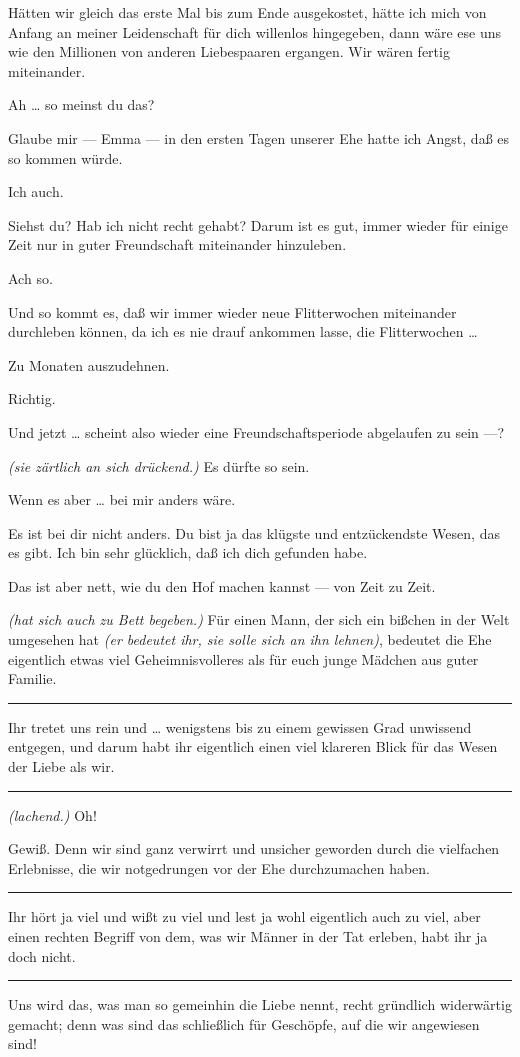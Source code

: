 \documentclass[
	final,
	a4paper,
	ngerman,
	mpinclude = true, %
	twoside = true,
	open = right,
	cleardoublepage = plain,
	DIV = 13,
	BCOR = 1cm,
	titlepage = firstiscover,
	]{scrbook}
\newcommand{\direction}[1]{\textit{(#1)}}
\newenvironment{deletion}{%
		\vspace{0.25\baselineskip}
		\hrule
		\vspace{0.25\baselineskip}
		\color{darkgray}
	}{
		\color{black}
		\vspace{0.25\baselineskip}
		\hrule 
		\vspace{0.25\baselineskip}
	}
\newcommand{\thecharacter}[1]{\textup{\textsc{#1}}}
\newcommand{\thefrau}{\thecharacter{Junge Frau}}
\newcommand{\thegatte}{\thecharacter{Gatte}}
\newcommand{\character}[1]{\item[#1:]}
\newcommand{\frau}{\character{\thefrau}}
\newcommand{\gatte}{\character{\thegatte}}
\begin{document}
\begin{play}
	\gatte
	Hätten wir gleich das erste Mal bis zum Ende ausgekostet, hätte ich mich von Anfang an meiner Leidenschaft für dich willenlos hingegeben, dann wäre ese uns wie den Millionen von anderen Liebespaaren ergangen. Wir wären fertig miteinander.

	\frau
	Ah \ldots{} so meinst du das?

	\gatte
	Glaube mir --- Emma --- in den ersten Tagen unserer Ehe hatte ich Angst, daß es so kommen würde.

	\frau
	Ich auch.

	\gatte
	Siehst du? Hab ich nicht recht gehabt? Darum ist es gut, immer wieder für einige Zeit nur in guter Freundschaft miteinander hinzuleben.

	\frau
	Ach so.

	\gatte
	Und so kommt es, daß wir immer wieder neue Flitterwochen miteinander durchleben können, da ich es nie drauf ankommen lasse, die Flitterwochen \ldots{}

	\frau
	Zu Monaten auszudehnen.

	\gatte
	Richtig.

	\frau
	Und jetzt \ldots{} scheint also wieder eine Freundschaftsperiode abgelaufen zu sein ---?

	\gatte
	\direction{sie zärtlich an sich drückend.} Es dürfte so sein.

	\frau
	Wenn es aber \ldots{} bei mir anders wäre.

	\gatte
	Es ist bei dir nicht anders. Du bist ja das klügste und entzückendste Wesen, das es gibt. Ich bin sehr glücklich, daß ich dich gefunden habe.

	\frau
	Das ist aber nett, wie du den Hof machen kannst --- von Zeit zu Zeit.

	\gatte
	\direction{hat sich auch zu Bett begeben.} Für einen Mann, der sich ein bißchen in der Welt umgesehen hat \direction{er bedeutet ihr, sie solle sich an ihn lehnen}, bedeutet die Ehe eigentlich etwas viel Geheimnisvolleres als für euch junge Mädchen aus guter Familie.
	\begin{deletion}
		Ihr tretet uns rein und \ldots{} wenigstens bis zu einem gewissen Grad unwissend entgegen, und darum habt ihr eigentlich einen viel klareren Blick für das Wesen der Liebe als wir.
	\end{deletion}

	\frau
	\direction{lachend.} Oh!

	\gatte
	Gewiß. Denn wir sind ganz verwirrt und unsicher geworden durch die vielfachen Erlebnisse, die wir notgedrungen vor der Ehe durchzumachen haben.
	\begin{deletion}
		Ihr hört ja viel und wißt zu viel und lest ja wohl eigentlich auch zu viel, aber einen rechten Begriff von dem, was wir Männer in der Tat erleben, habt ihr ja doch nicht.
	\end{deletion}
	Uns wird das, was man so gemeinhin die Liebe nennt, recht gründlich widerwärtig gemacht; denn was sind das schließlich für Geschöpfe, auf die wir angewiesen sind!


\end{play}
\end{document}
